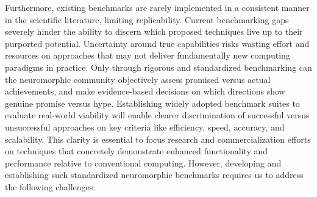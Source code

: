 Furthermore, existing benchmarks are rarely implemented in a consistent manner in the scientific literature, limiting replicability. Current benchmarking gaps severely hinder the ability to discern which proposed techniques live up to their purported potential. Uncertainty around true capabilities risks wasting effort and resources on approaches that may not deliver fundamentally new computing paradigms in practice. Only through rigorous and standardized benchmarking can the neuromorphic community objectively assess promised versus actual achievements, and make evidence-based decisions on which directions show genuine promise versus hype. Establishing widely adopted benchmark suites to evaluate real-world viability will enable clearer discrimination of successful versus unsuccessful approaches on key criteria like efficiency, speed, accuracy, and scalability. This clarity is essential to focus research and commercialization efforts on techniques that concretely demonstrate enhanced functionality and performance relative to conventional computing.
However, developing and establishing such standardized neuromorphic benchmarks requires us to address the following challenges:



